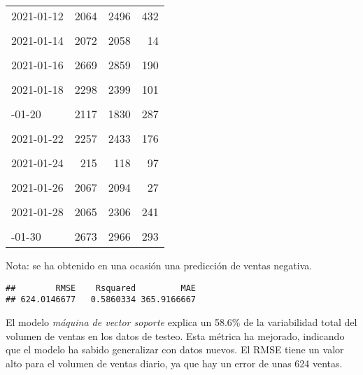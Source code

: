 \documentclass[
]{article}
\begin{document}
\begin{longtable}[t]{lrrr}
2021-01-12 & 2064 & 2496 & 432\\
\cellcolor{gray!6}{2021-01-13} & \cellcolor{gray!6}{2127} & \cellcolor{gray!6}{2116} & \cellcolor{gray!6}{11}\\
2021-01-14 & 2072 & 2058 & 14\\
\addlinespace
\cellcolor{gray!6}{2021-01-15} & \cellcolor{gray!6}{2248} & \cellcolor{gray!6}{2607} & \cellcolor{gray!6}{359}\\
2021-01-16 & 2669 & 2859 & 190\\
\cellcolor{gray!6}{2021-01-17} & \cellcolor{gray!6}{228} & \cellcolor{gray!6}{99} & \cellcolor{gray!6}{129}\\
2021-01-18 & 2298 & 2399 & 101\\
\cellcolor{gray!6}{2021-01-19} & \cellcolor{gray!6}{2068} & \cellcolor{gray!6}{2153} & \cellcolor{gray!6}{85}\\
\addlinespace
2021-01-20 & 2117 & 1830 & 287\\
\cellcolor{gray!6}{2021-01-21} & \cellcolor{gray!6}{2066} & \cellcolor{gray!6}{2100} & \cellcolor{gray!6}{34}\\
2021-01-22 & 2257 & 2433 & 176\\
\cellcolor{gray!6}{2021-01-23} & \cellcolor{gray!6}{2665} & \cellcolor{gray!6}{2992} & \cellcolor{gray!6}{327}\\
2021-01-24 & 215 & 118 & 97\\
\addlinespace
\cellcolor{gray!6}{2021-01-25} & \cellcolor{gray!6}{2295} & \cellcolor{gray!6}{2407} & \cellcolor{gray!6}{112}\\
2021-01-26 & 2067 & 2094 & 27\\
\cellcolor{gray!6}{2021-01-27} & \cellcolor{gray!6}{2123} & \cellcolor{gray!6}{2373} & \cellcolor{gray!6}{250}\\
2021-01-28 & 2065 & 2306 & 241\\
\cellcolor{gray!6}{2021-01-29} & \cellcolor{gray!6}{2259} & \cellcolor{gray!6}{2621} & \cellcolor{gray!6}{362}\\
\addlinespace
2021-01-30 & 2673 & 2966 & 293\\*
\end{longtable}

Nota: se ha obtenido en una ocasión una predicción de ventas negativa.

\begin{verbatim}
##        RMSE    Rsquared         MAE 
## 624.0146677   0.5860334 365.9166667
\end{verbatim}

El modelo \emph{máquina de vector soporte} explica un 58.6\% de la
variabilidad total del volumen de ventas en los datos de testeo. Esta
métrica ha mejorado, indicando que el modelo ha sabido generalizar con
datos nuevos. El RMSE tiene un valor alto para el volumen de ventas
diario, ya que hay un error de unas 624 ventas.
\end{document}
